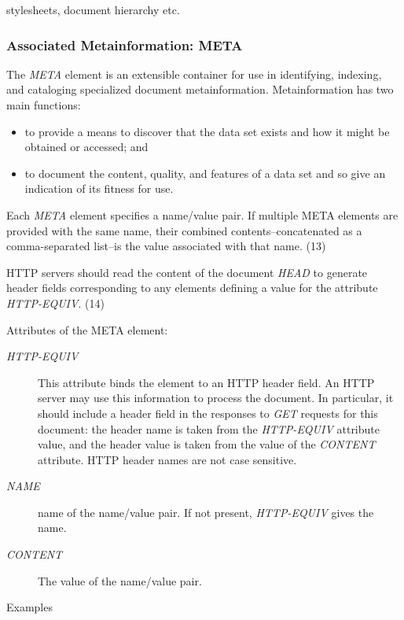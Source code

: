 stylesheets, document hierarchy etc.
\par \subsubsection*{Associated Metainformation:  META}\par 
The {\it META} element is an extensible container for use in
identifying, indexing, and cataloging specialized document
metainformation.  Metainformation has two main functions:
\par \begin{itemize}\item 
to provide a means to discover that the data set exists and
how it might be obtained or accessed;  and 
\item 
to document the content, quality, and features of a data set
and so give an indication of its fitness for use.  
\end{itemize}\par 
Each {\it META} element specifies a name/value pair.  If multiple
META elements are provided with the same name, their combined
contents--concatenated as a comma-separated list--is the value
associated with that name.
(13)\par \par 
HTTP servers should read the content of the document {\it HEAD} to
generate header fields corresponding to any elements defining a value
for the attribute {\it HTTP-EQUIV}.
(14)\par \par 
Attributes of the META element:
\par \begin{description}\item[{\it HTTP-EQUIV}]
This attribute binds the element to an HTTP header
field.  An HTTP server may use this information to process the
document.  In particular, it should include a header field in the
responses to {\it GET} requests for this document:  the header name is
taken from the {\it HTTP-EQUIV} attribute value, and the header value
is taken from the value of the {\it CONTENT} attribute.  HTTP header
names are not case sensitive.
\item[{\it NAME}]
name of the name/value pair.  If not present,
{\it HTTP-EQUIV} gives the name.
\item[{\it CONTENT}]
The value of the name/value pair.
\end{description}\par 
Examples
\par \par 
